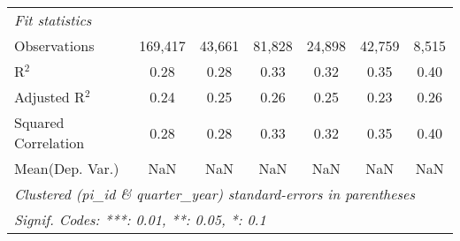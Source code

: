 \begin{tabular}{lcccccc}
   \midrule
   \emph{Fit statistics}\\
   Observations                                               & 169,417       & 43,661       & 81,828       & 24,898       & 42,759        & 8,515\\  
   R$^2$                                                      & 0.28          & 0.28         & 0.33         & 0.32         & 0.35          & 0.40\\  
   Adjusted R$^2$                                             & 0.24          & 0.25         & 0.26         & 0.25         & 0.23          & 0.26\\  
   Squared Correlation                                        & 0.28          & 0.28         & 0.33         & 0.32         & 0.35          & 0.40\\  
Mean(Dep. Var.) & NaN & NaN & NaN & NaN & NaN & NaN \\
   \midrule \midrule
   \multicolumn{7}{l}{\emph{Clustered (pi\_id \& quarter\_year) standard-errors in parentheses}}\\
   \multicolumn{7}{l}{\emph{Signif. Codes: ***: 0.01, **: 0.05, *: 0.1}}\\
\end{tabular}
\par\endgroup
